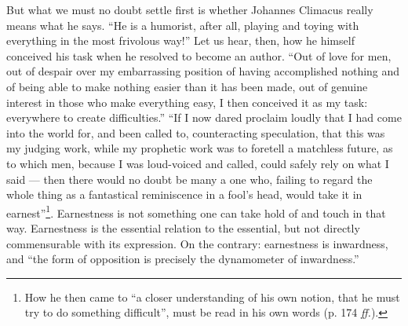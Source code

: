 \documentclass[12pt,a4paper]{book}
\newcommand{\opage}[1]{\marginnote{\footnotesize\textit{[#1]}}}
\begin{document}
But what we must no doubt settle first is whether Johannes Climacus really
means what he says. ``He is a humorist, after all, playing and toying with
everything in the most frivolous way!'' Let us hear, then, how he himself
conceived his task when he resolved to become an author. ``Out of love for
men, out of despair over my embarrassing position of having accomplished
nothing and of being able to make nothing easier than it has been made, out of
genuine interest in those who make everything easy, I then conceived it as my
task: everywhere to create difficulties.'' ``If I now dared proclaim loudly
that I had come into the world for, and been called to, counteracting
speculation, that this was my judging work, while my prophetic work was to
foretell a matchless future, as to which men, because I was loud-voiced and
called, could safely rely on what I said --- then there would no doubt be many
a one who, failing to regard the whole thing as a fantastical reminiscence in
a fool's head, would take it in
earnest''\footnote{How he then came to ``a closer understanding of his own
notion, that he must try to do something difficult'', must be read in his own
words (p. 174 \textit{ff.}).}. Earnestness is not
\opage{21}\setcounter{footnote}{0}%
something one can take hold of and touch in that way. Earnestness is the essential relation to the essential, but not directly commensurable with its expression. On the contrary: earnestness is inwardness, and ``the form of opposition is precisely the dynamometer of inwardness.''
\end{document}
